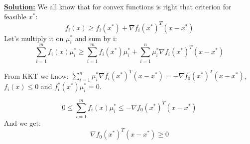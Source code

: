 \underline{\textbf{Solution:}}
We all know that for convex functions is right that criterion for feasible $x^*$:
\begin{equation*}
    f_i(x) \geq f_i(x^*) + \nabla f_i(x^*)^T(x-x^*) 
\end{equation*}
Let's multiply it on $\mu_i^*$ and sum by i:
\begin{equation*}
    \sum\limits_{i=1}^{m}f_i(x)\mu_i^* \geq \sum\limits_{i=1}^m f_i(x^*)\mu_i^* + \sum\limits_{i=1}^n \mu_i^* \nabla f_i(x^*)^T(x-x^*)
\end{equation*}

From KKT we know: $\sum\limits_{i=1}^n \mu_i^* \nabla f_i(x^*)^T(x-x^*) = - \nabla f_0(x^*)^T(x-x^*)$,  $f_i(x) \leq 0$ and $f_i^*(x^*)\mu_i^* = 0$.

\begin{equation*}
    0 \leq \sum\limits_{i=1}^{m}f_i(x)\mu_i^* \leq -\nabla f_0(x^*)^T(x-x^*)
\end{equation*}
And we get:
\begin{equation*}
    \nabla f_0(x^*)^T(x-x^*) \geq 0 
\end{equation*}



